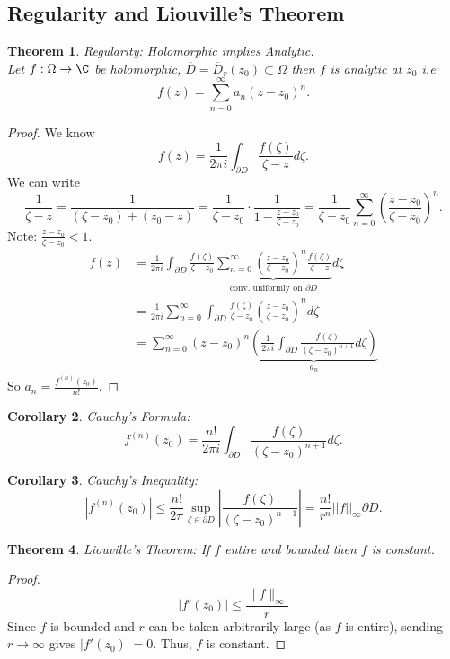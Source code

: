 \documentclass[a4paper]{article}
\newtheorem{thm}{Theorem}[section]
\newtheorem{cor}[thm]{Corollary}
\begin{document}
\subsection{Regularity and Liouville's Theorem}
\begin{thm}
    Regularity: Holomorphic implies Analytic. \\
    Let $f:\Omega\to \C$ be holomorphic, $\overline{D}=\overline{D}_r(z_0)\subset \Omega$ then $f$ is analytic at $z_0$ i.e \[
    f(z)=\sum_{n=0}^\infty a_n(z-z_0)^n
    .\] 
\end{thm}
\begin{proof}
    We know \[
    f(z)=\frac{1}{2\pi i}\int_{\partial D}\frac{f(\zeta)}{\zeta-z}d\zeta
    .\] 
    We can write \[
    \frac{1}{\zeta-z}=\frac{1}{(\zeta-z_0)+(z_0-z)}=\frac{1}{\zeta - z_0}\cdot \frac{1}{1-\frac{z-z_0}{\zeta - z_0}}=\frac{1}{\zeta-z_0}\sum_{n=0}^\infty \left (\frac{z-z_0}{\zeta-z_0}\right )^n
    .\] 
    Note: $\frac{z-z_0}{\zeta-z_0}<1$. 
    \begin{align*}
        f(z)&=\frac{1}{2\pi i}\int_{\partial D}\frac{f(\zeta)}{\zeta-z_0}\underbrace{\sum_{n=0}^\infty \left (\frac{z-z_0}{\zeta-z_0}\right )^n \frac{f(\zeta)}{\zeta -z}}_{ \text{conv. uniformly on $\partial D$}} d\zeta\\
        &=\frac{1}{2\pi i}\sum_{n=0}^\infty \int_{\partial D}\frac{f(\zeta)}{\zeta-z_0}\left (\frac{z-z_0}{\zeta-z_0}\right )^n d\zeta\\
        &=\sum_{n=0}^{\infty} (z-z_0)^n 
            \underbrace{\left( \frac{1}{2\pi i} \int_{\partial D} \frac{f(\zeta)}{(\zeta-z_0)^{n+1}} d\zeta \right)}_{a_n}
    \end{align*}
    So $a_n=\frac{f^{(n)}(z_0)}{n!}$.
\end{proof}
\begin{cor}
    Cauchy's Formula:
    \[
    f^{(n)}(z_0)=\frac{n!}{2\pi i}\int_{\partial D}\frac{f(\zeta)}{(\zeta-z_0)^{n+1}}d\zeta
    .\] 
\end{cor}
\begin{cor}
    Cauchy's Inequality:
    \[
    \left | f^{(n)}(z_0) \right | \leq \frac{n!}{2\pi} \sup_{\zeta\in \partial D} \left | \frac{f(\zeta)}{(\zeta-z_0)^{n+1}} \right |=\frac{n!}{r^n}||f||_\infty\partial D
    .\] 
\end{cor}
\begin{thm}
    Liouville's Theorem: If $f$ entire and bounded then $f$ is constant.
\end{thm}
\begin{proof}
    \[
    |f'(z_0)| \leq \frac{\|f\|_\infty}{r}
    \]
    Since $f$ is bounded and $r$ can be taken arbitrarily large (as $f$ is entire), sending $r \to \infty$ gives $|f'(z_0)| = 0$. Thus, $f$ is constant.
\end{proof}
\newpage
\end{document}
